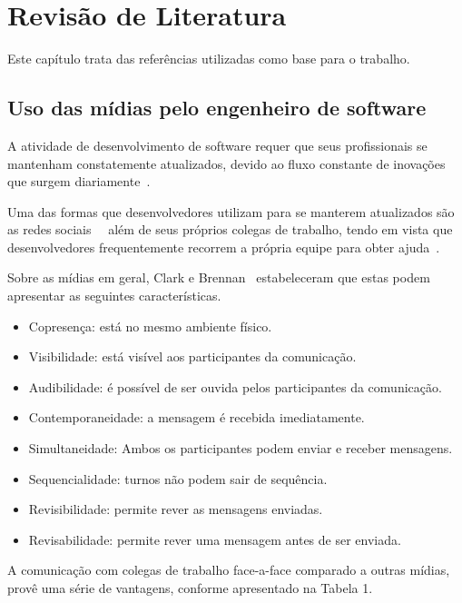 \chapter{Revisão de Literatura}

Este capítulo trata das referências utilizadas como base para o trabalho.

\section{Uso das mídias pelo engenheiro de software}

A atividade de desenvolvimento de software requer que seus profissionais se mantenham constatemente atualizados, devido ao fluxo constante de inovações que surgem diariamente~\cite{Singer2014}.

Uma das formas que desenvolvedores utilizam para se manterem atualizados são as redes sociais~\cite{Treude2012}~\cite{Storey2014} além de seus próprios colegas de trabalho, tendo em vista que desenvolvedores frequentemente recorrem a própria equipe para obter ajuda~\cite{Weinberg1998}.

Sobre as mídias em geral, Clark e Brennan~\cite{Clark1991} estabeleceram que estas podem apresentar as seguintes características.

\begin{itemize}
  \item Copresença: está no mesmo ambiente físico.
  \item Visibilidade: está visível aos participantes da comunicação.
  \item Audibilidade: é possível de ser ouvida pelos participantes da comunicação.
  \item Contemporaneidade: a mensagem é recebida imediatamente.
  \item Simultaneidade: Ambos os participantes podem enviar e receber mensagens.
  \item Sequencialidade: turnos não podem sair de sequência.
  \item Revisibilidade: permite rever as mensagens enviadas.
  \item Revisabilidade: permite rever uma mensagem antes de ser enviada.
\end{itemize}

A comunicação com colegas de trabalho face-a-face comparado a outras mídias, provê uma série de vantagens, conforme apresentado na Tabela 1.

